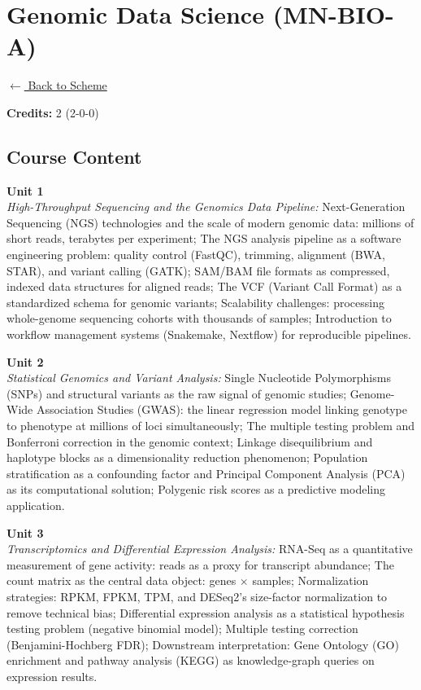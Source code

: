 \section*{Genomic Data Science (MN-BIO-A)}
\label{minor:BIO_L2}

\noindent \small{\hyperref[main:scheme]{$\leftarrow$ Back to Scheme}} \vspace{0.5cm}

\noindent \textbf{Credits:} 2 (2-0-0)

\subsection*{Course Content}
\noindent\textbf{Unit 1} \\
\textit{High-Throughput Sequencing and the Genomics Data Pipeline:} Next-Generation Sequencing (NGS) technologies and the scale of modern genomic data: millions of short reads, terabytes per experiment; The NGS analysis pipeline as a software engineering problem: quality control (FastQC), trimming, alignment (BWA, STAR), and variant calling (GATK); SAM/BAM file formats as compressed, indexed data structures for aligned reads; The VCF (Variant Call Format) as a standardized schema for genomic variants; Scalability challenges: processing whole-genome sequencing cohorts with thousands of samples; Introduction to workflow management systems (Snakemake, Nextflow) for reproducible pipelines.

\vspace{0.3cm}

\noindent\textbf{Unit 2} \\
\textit{Statistical Genomics and Variant Analysis:} Single Nucleotide Polymorphisms (SNPs) and structural variants as the raw signal of genomic studies; Genome-Wide Association Studies (GWAS): the linear regression model linking genotype to phenotype at millions of loci simultaneously; The multiple testing problem and Bonferroni correction in the genomic context; Linkage disequilibrium and haplotype blocks as a dimensionality reduction phenomenon; Population stratification as a confounding factor and Principal Component Analysis (PCA) as its computational solution; Polygenic risk scores as a predictive modeling application.

\vspace{0.3cm}

\noindent\textbf{Unit 3} \\
\textit{Transcriptomics and Differential Expression Analysis:} RNA-Seq as a quantitative measurement of gene activity: reads as a proxy for transcript abundance; The count matrix as the central data object: genes $\times$ samples; Normalization strategies: RPKM, FPKM, TPM, and DESeq2's size-factor normalization to remove technical bias; Differential expression analysis as a statistical hypothesis testing problem (negative binomial model); Multiple testing correction (Benjamini-Hochberg FDR); Downstream interpretation: Gene Ontology (GO) enrichment and pathway analysis (KEGG) as knowledge-graph queries on expression results.

